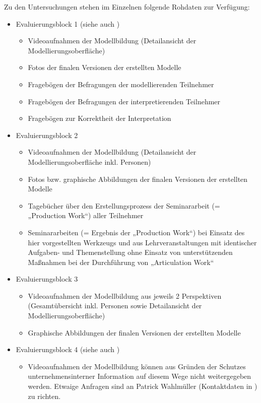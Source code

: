 Zu den Untersuchungen stehen im Einzelnen folgende Rohdaten zur Verfügung:
\begin{itemize}
	\item Evaluierungsblock 1 (siehe auch \citep{Bohninger10})
		\begin{itemize}
			\item Videoaufnahmen der Modellbildung (Detailansicht der Modellierungsoberfläche)
			\item Fotos der finalen Versionen der erstellten Modelle
			\item Fragebögen der Befragungen der modellierenden Teilnehmer
			\item Fragebögen der Befragungen der interpretierenden Teilnehmer
			\item Fragebögen zur Korrektheit der Interpretation 
		\end{itemize}
	\item Evaluierungsblock 2
		\begin{itemize}
			\item Videoaufnahmen der Modellbildung (Detailansicht der Modellierungsoberfläche inkl. Personen)
			\item Fotos bzw. graphische Abbildungen der finalen Versionen der erstellten Modelle
			\item Tagebücher über den Erstellungsprozess der Seminararbeit (= „Production Work“) aller Teilnehmer
			\item Seminararbeiten (= Ergebnis der „Production Work“) bei Einsatz des hier vorgestellten Werkzeugs und aus Lehrveranstaltungen mit identischer Aufgaben- und Themenstellung ohne Einsatz von unterstützenden Maßnahmen bei der Durchführung von „Articulation Work“
		\end{itemize}
	\item Evaluierungsblock 3
		\begin{itemize}
			\item Videoaufnahmen der Modellbildung aus jeweils 2 Perspektiven (Gesamtübersicht inkl. Personen sowie Detailansicht der Modellierungsoberfläche)
			\item Graphische Abbildungen der finalen Versionen der erstellten Modelle
		\end{itemize}
	\item Evaluierungsblock 4 (siehe auch \citep{Wahlmuller10})
		\begin{itemize}
			\item Videoaufnahmen der Modellbildung können aus Gründen der Schutzes unternehmensinterner Information auf diesem Wege nicht weitergegeben werden. Etwaige Anfragen sind an Patrick Wahlmüller (Kontaktdaten in \citep{Wahlmuller10}) zu richten.

\end{itemize}
\end{itemize}
